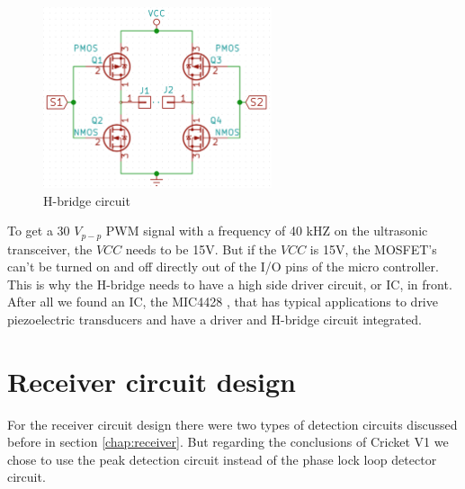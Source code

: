 \begin{figure}[H]
\centering
\includegraphics[width=0.6\textwidth]{Figures/hbridge.PNG}
\caption{H-bridge circuit}
\label{fig:h_bridge}
\end{figure}

To get a 30 $V_{p-p}$ PWM signal with a frequency of 40 kHZ on the ultrasonic transceiver, the $VCC$ needs to be 15V. But if the $VCC$ is 15V, the MOSFET's can't be turned on and off directly out of the I/O pins of the micro controller. This is why the H-bridge needs to have a high side driver circuit, or IC, in front. After all we found an IC, the MIC4428 \cite{MIC4428}, that has typical applications to drive piezoelectric transducers and have a driver and H-bridge circuit integrated.

\section{Receiver circuit design}
\label{chap:receivercircuit}
For the receiver circuit design there were two types of detection circuits discussed before in section \ref{chap:receiver}. But regarding the conclusions of Cricket V1 we chose to use the peak detection circuit instead of the phase lock loop detector circuit.

